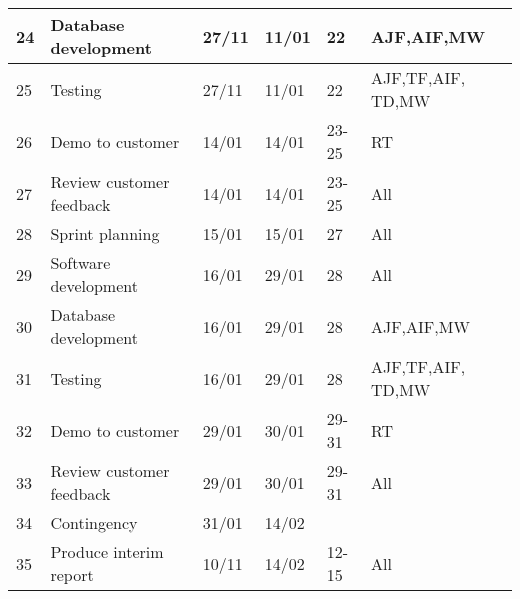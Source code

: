 \begin{longtable}{ | l | l | l | l | l | l | }
24 & Database development & 27/11 & 11/01 & 22 & AJF,AIF,MW \\ \hline
25 & Testing & 27/11 & 11/01 & 22 & AJF,TF,AIF, TD,MW \\ \hline
26 & Demo to customer & 14/01 & 14/01 & 23-25 & RT \\ \hline
27 & Review customer feedback & 14/01 & 14/01 & 23-25 & All \\ \hline
\hline
28 & Sprint planning & 15/01 & 15/01 & 27 & All \\ \hline
29 & Software development & 16/01 & 29/01 & 28 & All \\ \hline
30 & Database development & 16/01 & 29/01 & 28 & AJF,AIF,MW \\ \hline
31 & Testing & 16/01 & 29/01 & 28 & AJF,TF,AIF, TD,MW \\ \hline
32 & Demo to customer & 29/01 & 30/01 & 29-31 & RT \\ \hline
33 & Review customer feedback & 29/01 & 30/01 & 29-31 & All \\ \hline
\hline
34 & Contingency & 31/01 & 14/02 & & \\ \hline
35 & Produce interim report & 10/11 & 14/02 & 12-15 & All \\ \hline
\end{longtable}
